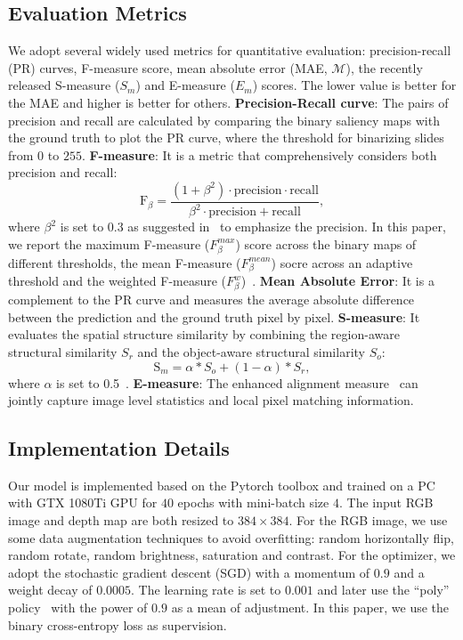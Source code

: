 \documentclass[runningheads]{llncs}
\begin{document}
\subsection{Evaluation Metrics} We adopt several widely used metrics for quantitative evaluation: precision-recall (PR) curves, F-measure score, mean absolute error (MAE, $\mathcal{M}$), the recently released S-measure ($S_{m}$) and E-measure ($E_{m}$) scores. The lower value is better for the MAE and higher is better for others.
\textbf{Precision-Recall curve}: The pairs of precision and recall are calculated by comparing the binary saliency maps with the ground truth to plot the PR curve, where the threshold for binarizing slides from $0$ to $255$.
\textbf{F-measure}: It is a metric that comprehensively considers both precision and recall:
 \begin{equation}\label{equ:7}
 \text{F}{_\beta } = \frac{{\left( {1 + {\beta ^2}} \right) \cdot \text{precision} \cdot \text{recall}}}{{{\beta ^2} \cdot \text{precision} + \text{recall}}},
 \end{equation}
  where $\beta^2$ is set to 0.3 as suggested in~\cite{colorcontrast_Fm} to emphasize the precision. In this paper, we report the maximum F-measure ($F_{\beta}^{max}$) score across the binary maps of different thresholds, the mean F-measure ($F_{\beta}^{mean}$) socre across an adaptive threshold and the weighted F-measure ($F_{\beta}^{w}$)~\cite{Fwb}.
\textbf{Mean Absolute Error}: It is a complement to the PR curve and measures the average absolute difference between the prediction and the  ground truth pixel by pixel.
\textbf{S-measure}: It evaluates the spatial structure similarity by combining the region-aware structural similarity  $S _ { r }$ and the object-aware structural similarity  $S _ { o }$: 
\begin{equation}\label{equ:8}
\text{S}{_m} = \alpha * S _ { o } + ( 1 - \alpha ) * S _ { r },
\end{equation}
where $\alpha$ is set to 0.5~\cite{S-m}.
\textbf{E-measure}: The enhanced alignment measure~\cite{Em} can jointly capture image level statistics and local pixel matching information.
\\
\subsection{Implementation Details} 
 Our model is implemented based on the Pytorch toolbox and trained on a PC with GTX 1080Ti GPU for $40$ epochs with mini-batch size $4$. The input RGB image and depth map are both resized to $384 \times 384$. For the RGB image, we use some data augmentation techniques to avoid overfitting: random horizontally flip, random rotate, random brightness, saturation and contrast. For the optimizer, we adopt the stochastic gradient descent (SGD) with a momentum of $0.9$ and a weight decay of $0.0005$. The learning rate is set to $0.001$ and later use the ``poly'' policy~\cite{poly} with the power of $0.9$ as a mean of adjustment. In this paper, we  use the binary cross-entropy loss as supervision.
\end{document}
